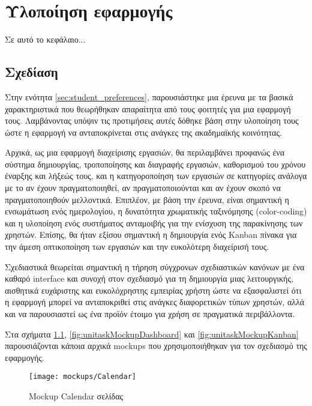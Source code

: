 \chapter{Υλοποίηση εφαρμογής} \label{ch:unitask}
    Σε αυτό το κεφάλαιο...

    \section{Σχεδίαση}
        Στην ενότητα \ref{sec:student_preferences}, παρουσιάστηκε μια έρευνα με τα βασικά χαρακτηριστικά που θεωρήθηκαν απαραίτητα από τους φοιτητές για μια εφαρμογή τους. Λαμβάνοντας υπόψιν τις προτιμήσεις αυτές δόθηκε βάση στην υλοποίηση τους ώστε η εφαρμογή να ανταποκρίνεται στις ανάγκες της ακαδημαϊκής κοινότητας.

        Αρχικά, ως μια εφαρμογή διαχείρισης εργασιών, θα περιλαμβάνει προφανώς ένα σύστημα δημιουργίας, τροποποίησης και διαγραφής εργασιών, καθορισμού του χρόνου έναρξης και λήξεώς τους, και η κατηγοροποίηση των εργασιών σε κατηγορίες ανάλογα με το αν έχουν πραγματοποιηθεί, αν πραγματοποιούνται και αν έχουν σκοπό να πραγματοποιηθούν μελλοντικά. Επιπλέον, με βάση την έρευνα, είναι σημαντική η ενσωμάτωση ενός ημερολογίου, η δυνατότητα χρωματικής ταξινόμησης (color-coding) και η υλοποίηση ενός συστήματος ανταμοιβής για την ενίσχυση της παρακίνησης των χρηστών. Επίσης, θα ήταν εξίσου σημαντική η δημιουργία ενός Kanban πίνακα για την άμεση οπτικοποίηση των εργασιών και την ευκολότερη διαχείρισή τους.

        Σχεδιαστικά θεωρείται σημαντική η τήρηση σύγχρονων σχεδιαστικών κανόνων με ένα καθαρό interface και συνοχή στον σχεδιασμό για τη δημιουργία μιας λειτουργικής, αισθητικά ευχάριστης και ευκολόχρηστης εμπειρίας χρήστη ώστε να εξασφαλιστεί ότι η εφαρμογή μπορεί να ανταποκριθεί στις ανάγκες διαφορετικών τύπων χρηστών, αλλά και να παρουσιαστεί ως ένα προϊόν έτοιμο για χρήση σε πραγματικά περιβάλλοντα.

        Στα σχήματα \ref{fig:unitaskMockupCalendar}, \ref{fig:unitaskMockupDashboard} και \ref{fig:unitaskMockupKanban} παρουσιάζονται κάποια αρχικά mockups που χρησιμοποιήθηκαν για τον σχεδιασμό της εφαρμογής.

        \begin{figure}[p!] \noindent \centering
            \texttt{[image: mockups/Calendar]}
            \caption{\centering Mockup Calendar σελίδας}
            \label{fig:unitaskMockupCalendar}
        \end{figure}

